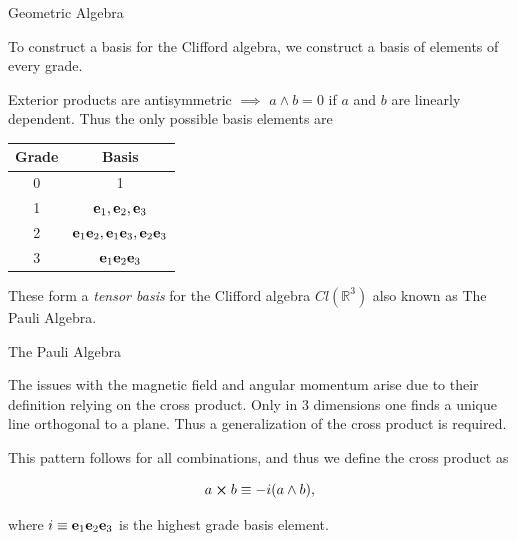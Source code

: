 \documentclass{beamer}
\begin{document}
\begin{frame}{Geometric Algebra}

To construct a basis for the Clifford algebra, we construct a basis of elements of every grade.
\pause

Exterior products are antisymmetric $\implies$ $a \wedge b = 0$ if $a$ and $b$ are linearly dependent. Thus the only possible basis elements are


\begin{table}
	\centering
	\begin{tabular}{c |c}
		\textbf{Grade} & \textbf{Basis}  \\
		\hline
		0 & 1 \\
		1 & $\vb e_1, \vb e_2, \vb e_3$ \\
		2 & $\vb e_1 \vb e_2, \vb e_1 \vb e_3, \vb e_2 \vb e_3$ \\
		3 & $\vb e_1 \vb e_2 \vb e_3$
	\end{tabular}
\end{table}

\pause

These form a \emph{tensor basis} for the Clifford algebra $Cl(\mathbb{R}^3)$ also known as \alert{The Pauli Algebra}.

\end{frame}

\begin{frame}{The Pauli Algebra}

The issues with the magnetic field and angular momentum arise due to their definition relying on the cross product. Only in 3 dimensions one finds a unique line orthogonal to a plane. \pause Thus a generalization of the cross product is required.

\pause


\pause

This pattern follows for all combinations, and thus we define the cross product as

\begin{equation}
	a \cross b \equiv -i(a\wedge b),
\end{equation}

where $i \equiv \vb e_1 \vb e_2 \vb e_3$ is the highest grade basis element.

\end{frame}
\end{document}
